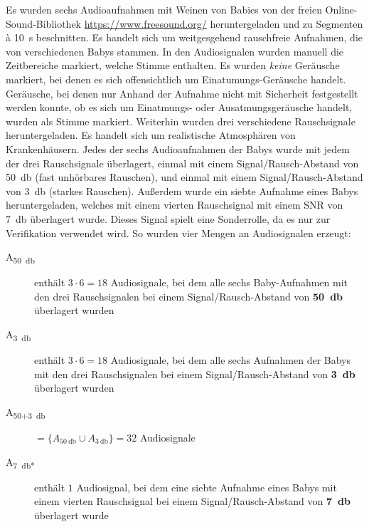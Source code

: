 Es wurden sechs Audioaufnahmen mit Weinen von Babies von der freien Online-Sound-Bibliothek \url{https://www.freesound.org/} heruntergeladen und zu Segmenten \`{a} \SI{10}{\second} beschnitten. Es handelt sich um weitgesgehend rauschfreie Aufnahmen, die von verschiedenen Babys stammen. In den Audiosignalen wurden manuell die Zeitbereiche markiert, welche Stimme enthalten. Es wurden \emph{keine} Geräusche markiert, bei denen es sich offensichtlich um Einatumungs-Geräusche handelt. Geräusche, bei denen nur Anhand der Aufnahme nicht mit Sicherheit festgestellt werden konnte, ob es sich um Einatmungs- oder Ausatmungsgeräusche handelt, wurden als Stimme markiert. Weiterhin wurden drei verschiedene Rauschsignale heruntergeladen. Es handelt sich um \glqq realistische\grqq{} Atmosphären von Krankenhäusern. Jedes der sechs Audioaufnahmen der Babys wurde mit jedem der drei Rauschsignale überlagert, einmal mit einem Signal/Rausch-Abstand von \SI{50}{\decibel} (\glqq fast unhörbares Rauschen\grqq), und einmal mit einem Signal/Rausch-Abstand von \SI{3}{\decibel} (\glqq starkes Rauschen\grqq). Außerdem wurde ein siebte Aufnahme eines Babys heruntergeladen, welches mit einem vierten Rauschsignal mit einem SNR von \SI{7}{\decibel} überlagert wurde. Dieses Signal spielt eine Sonderrolle, da es nur zur Verifikation verwendet wird. So wurden vier Mengen an Audiosignalen erzeugt:

\begin{description}
	\item[A\textsubscript{\SI{50}{\decibel}}] enthält $3 \cdot 6 = 18$ Audiosignale, bei dem alle sechs Baby-Aufnahmen mit den drei Rauschsignalen bei einem Signal/Rausch-Abstand von \textbf{\SI{50}{\decibel}} überlagert wurden
	
	\item[A\textsubscript{\SI{3}{\decibel}}] enthält $3 \cdot 6 = 18$ Audiosignale, bei dem alle sechs Aufnahmen der Babys mit den drei Rauschsignalen bei einem Signal/Rausch-Abstand von \textbf{\SI{3}{\decibel}} überlagert wurden
	
	\item[A\textsubscript{50+\SI{3}{\decibel}}] $ = \{ A_{\SI{50}{\decibel}} \cup  A_{\SI{3}{\decibel}}\} = 32$ Audiosignale
	
	\item[A\textsubscript{\SI{7}{\decibel}*}] enthält $1$ Audiosignal, bei dem eine siebte Aufnahme eines Babys mit einem vierten Rauschsignal bei einem Signal/Rausch-Abstand von \textbf{\SI{7}{\decibel}} überlagert wurde
	
\end{description}

